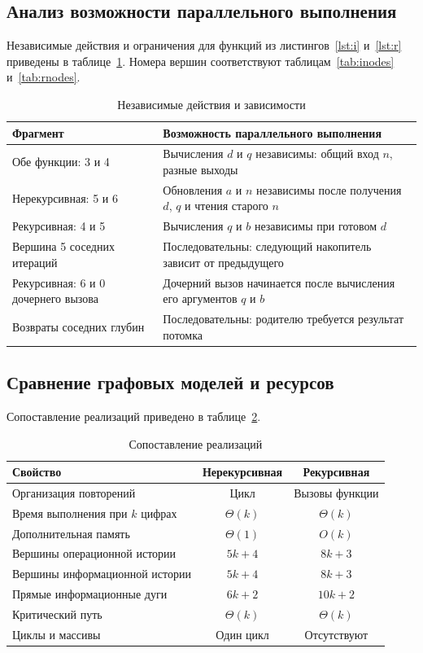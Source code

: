 \documentclass[14pt,a4paper]{extarticle}
\numberwithin{equation}{section}
\numberwithin{figure}{section}
\numberwithin{table}{section}
\begin{document}
\subsection{Анализ возможности параллельного выполнения}
Независимые действия и ограничения для функций из листингов~\ref{lst:i} и~\ref{lst:r} приведены в таблице~\ref{tab:parallel}. Номера вершин соответствуют таблицам~\ref{tab:inodes} и~\ref{tab:rnodes}.
\begin{table}[H]\centering\caption{Независимые действия и зависимости}\label{tab:parallel}
\small\begin{tabularx}{\textwidth}{|p{4.8cm}|>{\raggedright\arraybackslash}X|}\hline
Фрагмент & Возможность параллельного выполнения\\\hline
Обе функции: 3 и 4 & Вычисления $d$ и $q$ независимы: общий вход $n$, разные выходы\\\hline
Нерекурсивная: 5 и 6 & Обновления $a$ и $n$ независимы после получения $d$, $q$ и чтения старого $n$\\\hline
Рекурсивная: 4 и 5 & Вычисления $q$ и $b$ независимы при готовом $d$\\\hline
Вершина 5 соседних итераций & Последовательны: следующий накопитель зависит от предыдущего\\\hline
Рекурсивная: 6 и 0 дочернего вызова & Дочерний вызов начинается после вычисления его аргументов $q$ и $b$\\\hline
Возвраты соседних глубин & Последовательны: родителю требуется результат потомка\\\hline
\end{tabularx}\end{table}

\subsection{Сравнение графовых моделей и ресурсов}
Сопоставление реализаций приведено в таблице~\ref{tab:compare}.
\begin{table}[H]\centering\caption{Сопоставление реализаций}\label{tab:compare}
\small\begin{tabularx}{\textwidth}{|>{\raggedright\arraybackslash}X|c|c|}\hline
Свойство & Нерекурсивная & Рекурсивная\\\hline
Организация повторений & Цикл & Вызовы функции\\\hline
Время выполнения при $k$ цифрах & $\Theta(k)$ & $\Theta(k)$\\\hline
Дополнительная память & $\Theta(1)$ & $O(k)$\\\hline
Вершины операционной истории & $5k+4$ & $8k+3$\\\hline
Вершины информационной истории & $5k+4$ & $8k+3$\\\hline
Прямые информационные дуги & $6k+2$ & $10k+2$\\\hline
Критический путь & $\Theta(k)$ & $\Theta(k)$\\\hline
Циклы и массивы & Один цикл & Отсутствуют\\\hline
\end{tabularx}\end{table}
\end{document}
